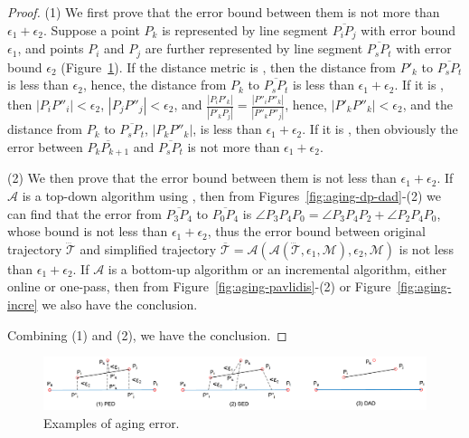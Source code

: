 \begin{proof} 	
	(1) We first prove that the error bound between them is not more than $\epsilon_1+ \epsilon_2$. Suppose a point $P_k$ is represented by line segment $\overline{P_iP_j}$ with error bound $\epsilon_1$, and points $P_i$ and $P_j$ are further represented by line segment $\overline{P_sP_t}$ with error bound $\epsilon_2$ (Figure~\ref{fig:aging-error}).
	If the distance metric is \ped, then the distance from $P'_k$ to $\overline{P_sP_t}$ is less than $\epsilon_2$, hence, the distance from $P_k$ to $\overline{P_sP_t}$ is less than $\epsilon_1 + \epsilon_2$.
	If it is \sed, then $|P_iP''_i|<\epsilon_2$, $|P_jP''_j|<\epsilon_2$, and $\frac{|P_iP'_k|}{|P'_kP_j|} = \frac{|P''_iP''_k|}{|P''_kP''_j|}$, hence, $|P'_kP''_k|<\epsilon_2$, and the distance from $P_k$ to $\overline{P_sP_t}$, \ie $|P_kP''_k|$, is less than $\epsilon_1 + \epsilon_2$.
	If it is \dad, then obviously the error between $\overline{P_kP_{k+1}}$ and $\overline{P_sP_t}$ is not more than $\epsilon_1+ \epsilon_2$.
	
	(2) We then prove that the  error bound between them is not less than $\epsilon_1+ \epsilon_2$.
	If $\mathcal{A}$ is a top-down algorithm using \dad, then from Figures~\ref{fig:aging-dp-dad}-(2) we can find that the error from $\overline{P_3P_4}$ to $\overline{P_0P_4}$ is $\angle{P_3P_4P_0} = \angle{P_3P_4P_2} + \angle{P_2P_4P_0}$, whose bound is not less than $\epsilon_1 + \epsilon_2$, thus the error bound between original trajectory $\dddot{\mathcal{T}}$ and simplified trajectory $\overline{\mathcal{T}}=\mathcal{A}(\mathcal{A}(\dddot{\mathcal{T}}, \epsilon_1, \mathcal{M}), \epsilon_2, \mathcal{M})$ is not less than $\epsilon_1+ \epsilon_2$.
	If $\mathcal{A}$ is a bottom-up algorithm or an incremental algorithm, either online or one-pass, then from Figure~\ref{fig:aging-pavlidis}-(2) or Figure~\ref{fig:aging-incre} we also have the conclusion.
	
	
	Combining (1) and (2), we have the conclusion.
\end{proof}

\begin{figure}[tb!]
	\centering
	\includegraphics[scale=0.6]{Figures/Fig-aging-error.png}
	
	\caption{\small Examples of aging error.}
	\vspace{-2ex}
	\label{fig:aging-error}
\end{figure}

